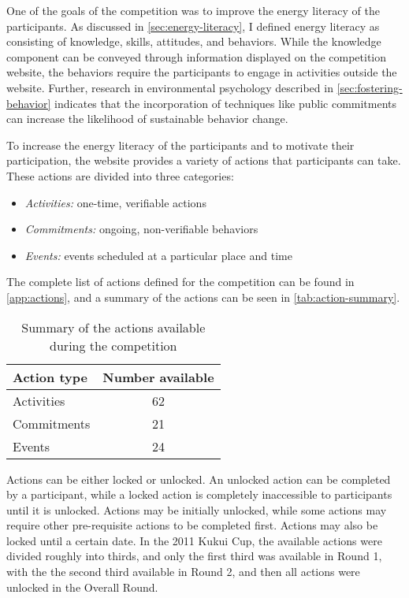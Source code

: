 One of the goals of the competition was to improve the energy literacy of the participants. As discussed in \autoref{sec:energy-literacy}, I defined energy literacy as consisting of knowledge, skills, attitudes, and behaviors. While the knowledge component can be conveyed through information displayed on the competition website, the behaviors require the participants to engage in activities outside the website. Further, research in environmental psychology described in \autoref{sec:fostering-behavior} indicates that the incorporation of techniques like public commitments can increase the likelihood of sustainable behavior change.

To increase the energy literacy of the participants and to motivate their participation, the website provides a variety of actions that participants can take. These actions are divided into three categories:

\begin{itemize}
	\item \emph{Activities:} one-time, verifiable actions
	\item \emph{Commitments:} ongoing, non-verifiable behaviors
	\item \emph{Events:} events scheduled at a particular place and time
\end{itemize}

The complete list of actions defined for the competition can be found in \autoref{app:actions}, and a summary of the actions can be seen in \autoref{tab:action-summary}.

\begin{table}[htbp]
	\centering
		\begin{tabular}{| l | c |}
			\hline
			Action type & Number available \tabularnewline \hline \hline
			Activities & 62 \\
			Commitments & 21 \\
			Events & 24 \\ \hline
		\end{tabular}
	\caption{Summary of the actions available during the competition}
\label{tab:action-summary}
\end{table}

Actions can be either locked or unlocked. An unlocked action can be completed by a participant, while a locked action is completely inaccessible to participants until it is unlocked. Actions may be initially unlocked, while some actions may require other pre-requisite actions to be completed first. Actions may also be locked until a certain date. In the 2011 Kukui Cup, the available actions were divided roughly into thirds, and only the first third was available in Round 1, with the the second third available in Round 2, and then all actions were unlocked in the Overall Round.

